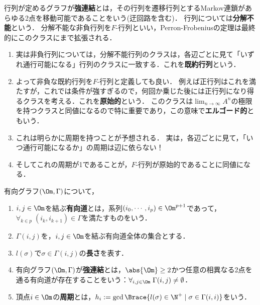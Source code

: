 \documentclass[uplatex, dvipdfmx]{jsreport}
\begin{document}
\begin{tcolorbox}[colframe=ForestGreen, colback=ForestGreen!10!white,breakable,colbacktitle=ForestGreen!40!white,coltitle=black,fonttitle=\bfseries\sffamily,
title=]
    行列が定めるグラフが\textbf{強連結}とは，その行列を遷移行列とするMarkov連鎖があらゆる2点を移動可能であることをいう(迂回路を含む)．
    行列については\textbf{分解不能}という．
    分解不能な非負行列を$F$-行列といい，Perron-Frobeniusの定理は最終的にこのクラスにまで拡張される．
    \begin{enumerate}
        \item 実は非負行列については，分解不能行列のクラスは，各辺ごとに見て「いずれ通行可能になる」行列のクラスに一致する．これを\textbf{既約行列}という．
        \item よって非負な既約行列を$F$-行列と定義しても良い．
        例えば正行列はこれを満たすが，これでは条件が強すぎるので，何回か乗じた後には正行列になり得るクラスを考える．これを\textbf{原始的}という．
        このクラスは$\lim_{n\to\infty}A^n$の極限を持つクラスと同値になるので特に重要であり，この意味で\textbf{エルゴード的}ともいう．
        \item これは明らかに周期を持つことが予想される．
        実は，各辺ごとに見て，「いつ通行可能になるか」の周期は辺に依らない！
        \item そしてこれの周期が1であることが，$F$-行列が原始的であることに同値になる．
    \end{enumerate}
\end{tcolorbox}

\begin{definition}
    有向グラフ$(\Om,\Gamma)$について，
    \begin{enumerate}
        \item $i,j\in\Om$を結ぶ\textbf{有向道}とは，系列$(i_0,\cdots,i_p)\in\Om^{p+1}$であって，$\forall_{k\in p}\;(i_k,i_{k+1})\in\Gamma$を満たすものをいう．
        \item $\Gamma(i,j)$を，$i,j\in\Om$を結ぶ有向道全体の集合とする．
        \item $l(\sigma)$で$\sigma\in\Gamma(i,j)$の\textbf{長さ}を表す．
        \item 有向グラフ$(\Om,\Gamma)$が\textbf{強連結}とは，$\abs{\Om}\ge2$かつ任意の相異なる2点を通る有向道が存在することをいう：$\forall_{i,j\in\Om}\;\Gamma(i,j)\ne\emptyset$．
        \item 頂点$i\in\Om$の\textbf{周期}とは，$h_i:=\gcd\Brace{l(\sigma)\in\N^+\mid\sigma\in\Gamma(i,i)}$をいう．
    \end{enumerate}
\end{definition}
\end{document}
